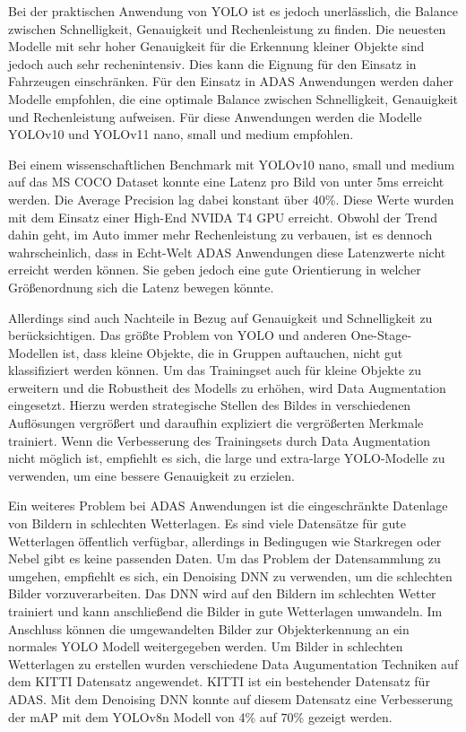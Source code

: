 Bei der praktischen Anwendung von \ac{YOLO} ist es jedoch unerlässlich, die Balance zwischen Schnelligkeit, Genauigkeit und Rechenleistung zu finden. Die neuesten Modelle mit sehr hoher Genauigkeit für die Erkennung kleiner Objekte sind jedoch auch sehr rechenintensiv. Dies kann die Eignung für den Einsatz in Fahrzeugen einschränken. Für den Einsatz in \ac{ADAS} Anwendungen werden daher Modelle empfohlen, die eine optimale Balance zwischen Schnelligkeit, Genauigkeit und Rechenleistung aufweisen. Für diese Anwendungen werden die Modelle YOLOv10 und YOLOv11 nano, small und medium empfohlen. \cite{benchmark} 

Bei einem wissenschaftlichen Benchmark mit YOLOv10 nano, small und medium auf das MS COCO Dataset konnte eine Latenz pro Bild von unter 5ms erreicht werden. Die Average Precision lag dabei konstant über 40\%. Diese Werte wurden mit dem Einsatz einer High-End NVIDA T4 GPU erreicht. \cite{yolospeed} Obwohl der Trend dahin geht, im Auto immer mehr Rechenleistung zu verbauen, ist es dennoch wahrscheinlich, dass in Echt-Welt \ac{ADAS} Anwendungen diese Latenzwerte nicht erreicht werden können. Sie geben jedoch eine gute Orientierung in welcher Größenordnung sich die Latenz bewegen könnte. 

Allerdings sind auch Nachteile in Bezug auf Genauigkeit und Schnelligkeit zu berücksichtigen. Das größte Problem von \ac{YOLO} und anderen One-Stage-Modellen ist, dass kleine Objekte, die in Gruppen auftauchen, nicht gut klassifiziert werden können. \cite{YOLO} Um das Trainingset auch für kleine Objekte zu erweitern und die Robustheit des Modells zu erhöhen, wird Data Augmentation eingesetzt. Hierzu werden strategische Stellen des Bildes in verschiedenen Auflösungen vergrößert und daraufhin expliziert die vergrößerten Merkmale trainiert. \cite{SSD} Wenn die Verbesserung des Trainingsets durch Data Augmentation nicht möglich ist, empfiehlt es sich, die large und extra-large \ac{YOLO}-Modelle zu verwenden, um eine bessere Genauigkeit zu erzielen. \cite{benchmark}

Ein weiteres Problem bei \ac{ADAS} Anwendungen ist die eingeschränkte Datenlage von Bildern in schlechten Wetterlagen. Es sind viele Datensätze für gute Wetterlagen öffentlich verfügbar, allerdings in Bedingugen wie Starkregen oder Nebel gibt es keine passenden Daten. Um das Problem der Datensammlung zu umgehen, empfiehlt es sich, ein Denoising \ac{DNN} zu verwenden, um die schlechten Bilder vorzuverarbeiten. Das \ac{DNN} wird auf den Bildern im schlechten Wetter trainiert und kann anschließend die Bilder in gute Wetterlagen umwandeln. Im Anschluss können die umgewandelten Bilder zur Objekterkennung an ein normales \ac{YOLO} Modell weitergegeben werden. Um Bilder in schlechten Wetterlagen zu erstellen wurden verschiedene Data Augumentation Techniken auf dem KITTI Datensatz angewendet. KITTI ist ein bestehender Datensatz für \ac{ADAS}. Mit dem Denoising \ac{DNN} konnte auf diesem Datensatz eine Verbesserung der \ac{mAP} mit dem YOLOv8n Modell von 4\% auf 70\% gezeigt werden. \cite{AdverseWeather} 

